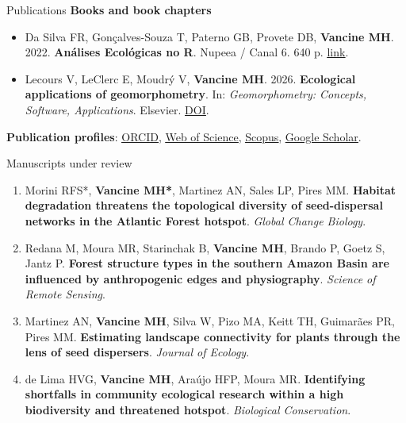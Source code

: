 \documentclass{resume}
\begin{document}
\begin{rSection}{Publications}
\textbf{Books and book chapters}
\begin{itemize}
\item Da Silva FR, Gonçalves-Souza T, Paterno GB, Provete DB, \textbf{Vancine MH}. 2022. \textbf{Análises Ecológicas no R}. Nupeea / Canal 6. 640 p. \href{https://analises-ecologicas.com/}{\underline{link}}.
\item Lecours V, LeClerc E, Moudrý V, \textbf{Vancine MH}. 2026. \textbf{Ecological applications of geomorphometry}. In: \textit{Geomorphometry: Concepts, Software, Applications}. Elsevier. \href{https://doi.org/10.1016/B978-0-44-333376-7.00037-9}{\underline{DOI}}.
\end{itemize}

\textbf{Publication profiles}: \href{https://orcid.org/0000-0001-9650-7575}{\underline{ORCID}}, \href{https://www.webofscience.com/wos/author/record/837504}{\underline{Web of Science}}, \href{https://www.scopus.com/authid/detail.uri?authorId=57193451888}{\underline{Scopus}}, \href{https://scholar.google.com/citations?user=i-2xZBQAAAAJ}{\underline{Google Scholar}}.
\end{rSection}

\begin{rSection}{Manuscripts under review}
\begin{enumerate}
\item Morini RFS*, \textbf{Vancine MH*}, Martinez AN, Sales LP, Pires MM. \textbf{Habitat degradation threatens the topological diversity of seed-dispersal networks in the Atlantic Forest hotspot}. \textit{Global Change Biology}.
\item Redana M, Moura MR, Starinchak B, \textbf{Vancine MH}, Brando P, Goetz S, Jantz P. \textbf{Forest structure types in the southern Amazon Basin are influenced by anthropogenic edges and physiography}. \textit{Science of Remote Sensing}.
\item Martinez AN, \textbf{Vancine MH}, Silva W, Pizo MA, Keitt TH, Guimarães PR, Pires MM. \textbf{Estimating landscape connectivity for plants through the lens of seed dispersers}. \textit{Journal of Ecology}.
\item de Lima HVG, \textbf{Vancine MH}, Araújo HFP, Moura MR. \textbf{Identifying shortfalls in community ecological research within a high biodiversity and threatened hotspot}. \textit{Biological Conservation}.
\end{enumerate}
\end{rSection}
\end{document}
